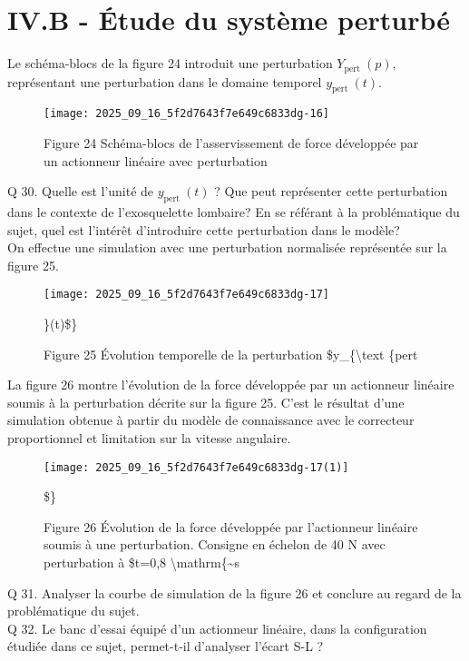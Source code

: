 \section{IV.B - Étude du système perturbé}
Le schéma-blocs de la figure 24 introduit une perturbation $Y_{\text {pert }}(p)$, représentant une perturbation dans le domaine temporel $y_{\text {pert }}(t)$.

\begin{figure}[h]
\begin{center}
  \texttt{[image: 2025\_09\_16\_5f2d7643f7e649c6833dg-16]}
\captionsetup{labelformat=empty}
\caption{Figure 24 Schéma-blocs de l'asservissement de force développée par un actionneur linéaire avec perturbation}
\end{center}
\end{figure}

Q 30. Quelle est l'unité de $y_{\text {pert }}(t)$ ? Que peut représenter cette perturbation dans le contexte de l'exosquelette lombaire? En se référant à la problématique du sujet, quel est l'intérêt d'introduire cette perturbation dans le modèle?\\
On effectue une simulation avec une perturbation normalisée représentée sur la figure 25.

\begin{figure}[h]
\begin{center}
  \texttt{[image: 2025\_09\_16\_5f2d7643f7e649c6833dg-17]}
\captionsetup{labelformat=empty}
\caption{Figure 25 Évolution temporelle de la perturbation \$y\_\{\textbackslash text \{pert }\}(t)\$\}\end{center}
\end{figure}

La figure 26 montre l'évolution de la force développée par un actionneur linéaire soumis à la perturbation décrite sur la figure 25. C'est le résultat d'une simulation obtenue à partir du modèle de connaissance avec le correcteur proportionnel et limitation sur la vitesse angulaire.

\begin{figure}[h]
\begin{center}
  \texttt{[image: 2025\_09\_16\_5f2d7643f7e649c6833dg-17(1)]}
\captionsetup{labelformat=empty}
\caption{Figure 26 Évolution de la force développée par l'actionneur linéaire soumis à une perturbation. Consigne en échelon de 40 N avec perturbation à \$t=0,8 \textbackslash mathrm\{\~{}s}\$\}\end{center}
\end{figure}

Q 31. Analyser la courbe de simulation de la figure 26 et conclure au regard de la problématique du sujet.\\
Q 32. Le banc d'essai équipé d'un actionneur linéaire, dans la configuration étudiée dans ce sujet, permet-t-il d'analyser l'écart S-L ?

